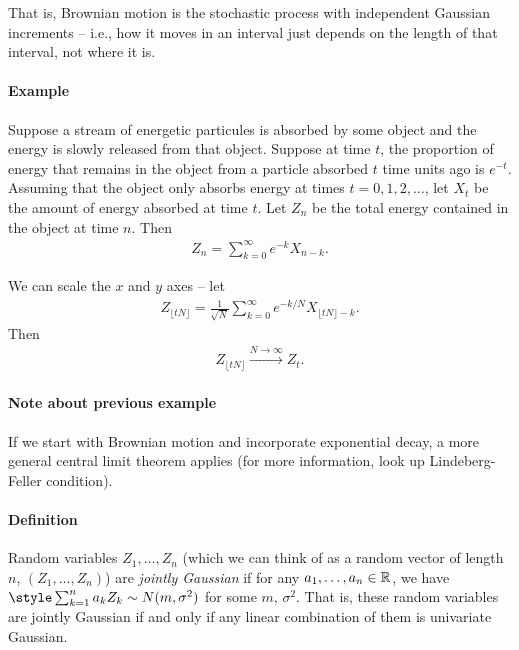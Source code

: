 \documentclass[../../../Master/AppliedStochastics.tex]{subfiles}
\begin{document}
That is, Brownian motion is the stochastic process with independent Gaussian increments 
-- i.e., how it moves in an interval just depends on the length of that interval, not where it is.

\paragraph{Example} Suppose a stream of energetic particules is absorbed by some object and the energy is slowly released from that object.  
Suppose at time $t$, the proportion of energy that remains in the object from a particle absorbed $t$ time units ago is $e^{-t}$.  
Assuming that the object only absorbs energy at times $t=0,1,2,\dots$, let $X_t$ be the amount of energy absorbed at time $t$.  
Let $Z_n$ be the total energy contained in the object at time $n$.  
Then 
$$\begin{aligned}
    Z_n=\sum_{k=0}^\infty e^{-k}X_{n-k}.
\end{aligned}$$


We can scale the $x$ and $y$ axes -- let 
$$\begin{aligned}
    Z_{\lfloor tN\rfloor}=\frac{1}{\sqrt{N}}\sum_{k=0}^\infty e^{-k/N}X_{\lfloor tN\rfloor-k}.
\end{aligned}$$
Then 
$$\begin{aligned}
    Z_{\lfloor tN\rfloor}\xrightarrow{N\to\infty}Z_t.
\end{aligned}$$



\paragraph{Note about previous example} 
If we start with Brownian motion and incorporate exponential decay, 
a more general central limit theorem applies (for more information, look up Lindeberg-Feller condition).

\paragraph{Definition} 
Random variables $Z_1,\dots,Z_n$ (which we can think of as a random vector of length $n$, $(Z_1,\dots,Z_n)$) are \emph{jointly Gaussian} 
if for any $a_1,\dots,a_n\in\mathbb{R}$, we have $\style\sum_{k=1}^n a_kZ_k\sim N(m,\sigma^2)$ for some $m$, $\sigma^2$.  
That is, these random variables are jointly Gaussian if and only if any linear combination of them is univariate Gaussian.
\end{document}
